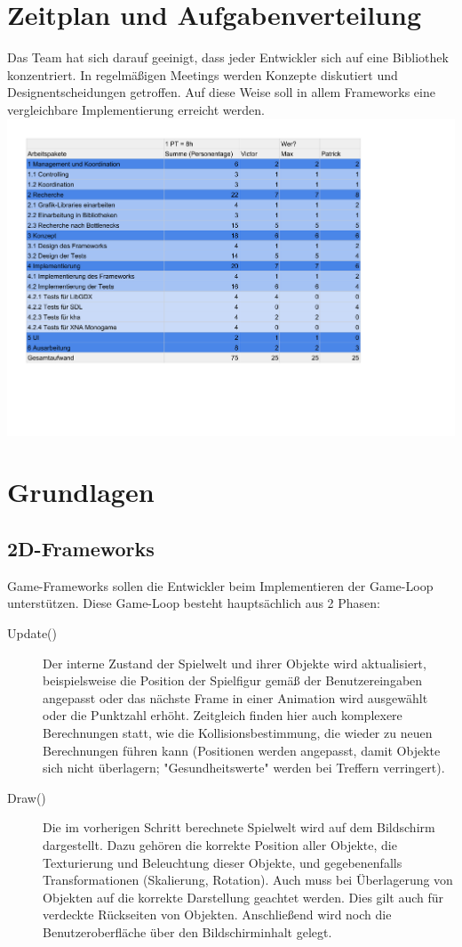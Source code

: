 \chapter{Zeitplan und Aufgabenverteilung}
\label{ch:projektplan}
Das Team hat sich darauf geeinigt, dass jeder Entwickler sich auf eine Bibliothek konzentriert. In regelmäßigen Meetings werden Konzepte diskutiert und Designentscheidungen getroffen. Auf diese Weise soll in allem Frameworks eine vergleichbare Implementierung erreicht werden.\\
\includegraphics[width=1.2\textwidth]{projektplan.pdf}


\chapter{Grundlagen}
\label{ch:basics}
\section{2D-Frameworks}
Game-Frameworks sollen die Entwickler beim Implementieren der Game-Loop unterstützen. Diese Game-Loop besteht hauptsächlich aus 2 Phasen:

\begin{description}
\item[Update()] Der interne Zustand der Spielwelt und ihrer Objekte wird aktualisiert, beispielsweise die Position der Spielfigur gemäß der Benutzereingaben angepasst oder das nächste Frame in einer Animation wird ausgewählt oder die Punktzahl erhöht. Zeitgleich finden hier auch komplexere Berechnungen statt, wie die Kollisionsbestimmung, die wieder zu neuen Berechnungen führen kann (Positionen werden angepasst, damit Objekte sich nicht überlagern; "Gesundheitswerte" werden bei Treffern verringert).\\
\item[Draw()] Die im vorherigen Schritt berechnete Spielwelt wird auf dem Bildschirm dargestellt. Dazu gehören die korrekte Position aller Objekte, die Texturierung und Beleuchtung dieser Objekte, und gegebenenfalls Transformationen (Skalierung, Rotation). Auch muss bei Überlagerung von Objekten auf die korrekte Darstellung geachtet werden. Dies gilt auch für verdeckte Rückseiten von Objekten. Anschließend wird noch die Benutzeroberfläche über den Bildschirminhalt gelegt.\\
\end{description}

